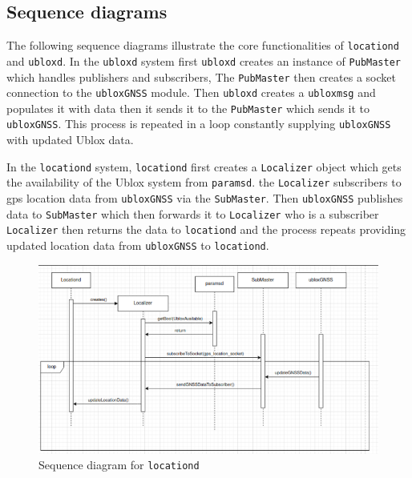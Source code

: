 \documentclass[12pt]{article}
\begin{document}
\subsection{Sequence diagrams}
The following sequence diagrams illustrate the core functionalities of \texttt{locationd} and \texttt{ubloxd}. 
In the \texttt{ubloxd} system first \texttt{ubloxd} creates an instance of \texttt{PubMaster} which handles publishers and subscribers, The \texttt{PubMaster} then creates a socket connection to the \texttt{ubloxGNSS} module. Then \texttt{ubloxd} creates a \texttt{ubloxmsg} and populates it with data then it sends it to the \texttt{PubMaster} which sends it to \texttt{ubloxGNSS}. This process is repeated in a loop constantly supplying \texttt{ubloxGNSS} with updated Ublox data.

In the \texttt{locationd} system, \texttt{locationd} first creates a \texttt{Localizer} object which gets the availability of the Ublox system from \texttt{paramsd}. the \texttt{Localizer} subscribers to gps location data from \texttt{ubloxGNSS} via the \texttt{SubMaster}. Then \texttt{ubloxGNSS} publishes data to \texttt{SubMaster} which then forwards it to \texttt{Localizer}  who is a subscriber \texttt{Localizer} then returns the data to \texttt{locationd} and the process repeats providing updated location data from \texttt{ubloxGNSS} to \texttt{locationd}.


\begin{figure}[H]
    \centering
    \includegraphics[scale=0.5]{LocationdSequence.png}
    \caption{Sequence diagram for \texttt{locationd}}
    \label{fig:enter-label}
\end{figure}
\end{document}
